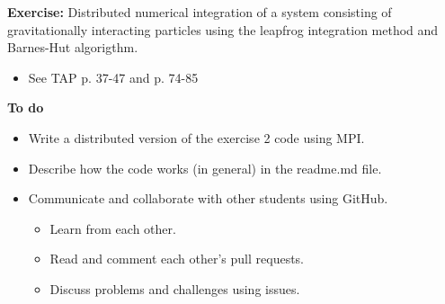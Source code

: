 
\subtitle{Course exercise 3\\ distributed dynamical simulation using Barnes-Hut and MPI}



\begin{frame}
  \titlepage
\end{frame}


\begin{frame}
  \textbf{Exercise:} Distributed numerical integration of a system consisting of gravitationally interacting particles using the leapfrog integration method and Barnes-Hut algorigthm.
  \begin{itemize}
   \item See TAP p. 37-47 and p. 74-85
  \end{itemize}


  \textbf{To do}
  \begin{itemize}
   \item Write a distributed version of the exercise 2 code using MPI.
   \item Describe how the code works (in general) in the readme.md file.
   \item Communicate and collaborate with other students using GitHub.
   \begin{itemize}
      \item Learn from each other.
     \item Read and comment each other's pull requests.
     \item Discuss problems and challenges using issues.
  \end{itemize}
  \end{itemize}
\end{frame}


